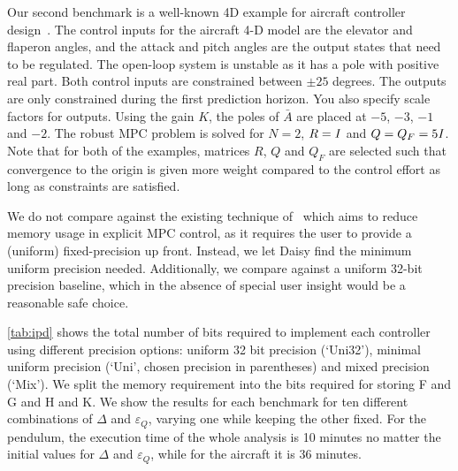 Our second benchmark is a well-known 4D example for aircraft
controller design~\cite{Kapasouris:1998}.
The control inputs for the aircraft 4-D model are the elevator and flaperon angles,
and the attack and pitch angles are the output states that need to be regulated.
The open-loop system is unstable as it has a pole with positive real part. Both
control inputs are constrained between $\pm25$ degrees. The outputs are
only constrained during the first prediction horizon. You also specify scale
factors for outputs. Using the gain $K$, the poles of $\bar A$ are placed at
$-5$, $-3$, $-1$ and $-2$. The robust MPC problem is solved for $N=2$,
$R=\mathbf{\it I}$ and $Q=Q_F=5\mathbf{\it I}$. Note that for both of the
examples, matrices $R$, $Q$ and $Q_F$ are selected such that convergence to the
origin is given more weight compared to the control effort as long as
constraints are satisfied.



We do not compare against the existing technique of~\citet{imperialrmpc} which aims to reduce memory
usage in explicit MPC control, as it requires the user to provide a (uniform)
fixed-precision up front. Instead, we let Daisy find the minimum uniform
precision needed. Additionally, we compare against a uniform 32-bit precision
baseline, which in the absence of special user insight would be a reasonable safe choice.

\autoref{tab:ipd} shows the total number of bits required to implement each
controller using different precision options: uniform 32 bit precision
(`Uni32'), minimal uniform precision (`Uni', chosen precision in parentheses)
and mixed precision (`Mix'). We split the memory requirement into the bits
required for storing F and G and H and K. We show the results for each benchmark
for ten different combinations of $\Delta$ and $\varepsilon_Q$, varying one while
keeping the other fixed.
For the pendulum, the execution time of the whole analysis is 10 minutes no matter the
initial values for $\Delta$ and $\varepsilon_Q$, while for the aircraft it is 36
minutes. 



